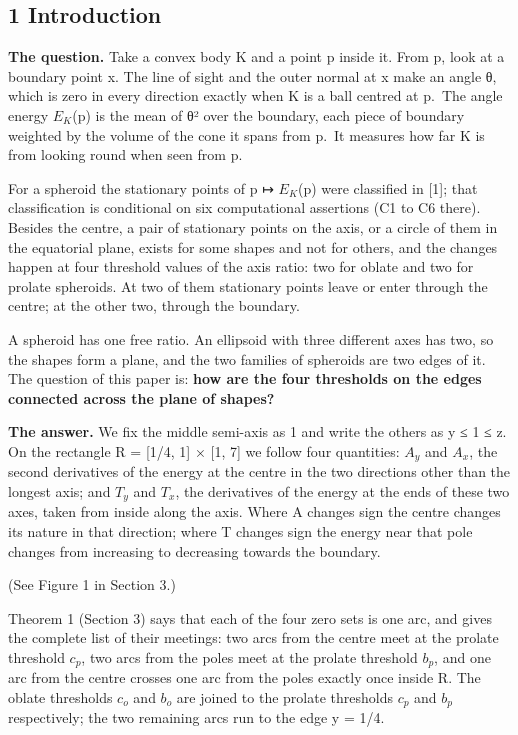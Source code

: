 \documentclass[
  11pt,
]{article}
\begin{document}
\subsection{1 Introduction}

\textbf{The question.} Take a convex body K and a point p inside it.
From p, look at a boundary point x. The line of sight and the outer
normal at x make an angle θ, which is zero in every direction exactly
when K is a ball centred at p.~The angle energy \(E_{K}\)(p) is the mean
of θ² over the boundary, each piece of boundary weighted by the volume
of the cone it spans from p.~It measures how far K is from looking round
when seen from p.

For a spheroid the stationary points of p ↦ \(E_{K}\)(p) were classified
in {[}1{]}; that classification is conditional on six computational
assertions (C1 to C6 there). Besides the centre, a pair of stationary
points on the axis, or a circle of them in the equatorial plane, exists
for some shapes and not for others, and the changes happen at four
threshold values of the axis ratio: two for oblate and two for prolate
spheroids. At two of them stationary points leave or enter through the
centre; at the other two, through the boundary.

A spheroid has one free ratio. An ellipsoid with three different axes
has two, so the shapes form a plane, and the two families of spheroids
are two edges of it. The question of this paper is: \textbf{how are the
four thresholds on the edges connected across the plane of shapes?}

\textbf{The answer.} We fix the middle semi-axis as 1 and write the
others as y ≤ 1 ≤ z. On the rectangle R = {[}1/4, 1{]} × {[}1, 7{]} we
follow four quantities: \(A_{y}\) and \(A_{x}\), the second derivatives
of the energy at the centre in the two directions other than the longest
axis; and \(T_{y}\) and \(T_{x}\), the derivatives of the energy at the
ends of these two axes, taken from inside along the axis. Where A
changes sign the centre changes its nature in that direction; where T
changes sign the energy near that pole changes from increasing to
decreasing towards the boundary.

(See Figure 1 in Section 3.)

Theorem 1 (Section 3) says that each of the four zero sets is one arc,
and gives the complete list of their meetings: two arcs from the centre
meet at the prolate threshold \(c_{p}\), two arcs from the poles meet at
the prolate threshold \(b_{p}\), and one arc from the centre crosses one
arc from the poles exactly once inside R. The oblate thresholds
\(c_{o}\) and \(b_{o}\) are joined to the prolate thresholds \(c_{p}\)
and \(b_{p}\) respectively; the two remaining arcs run to the edge y =
1/4.
\end{document}
